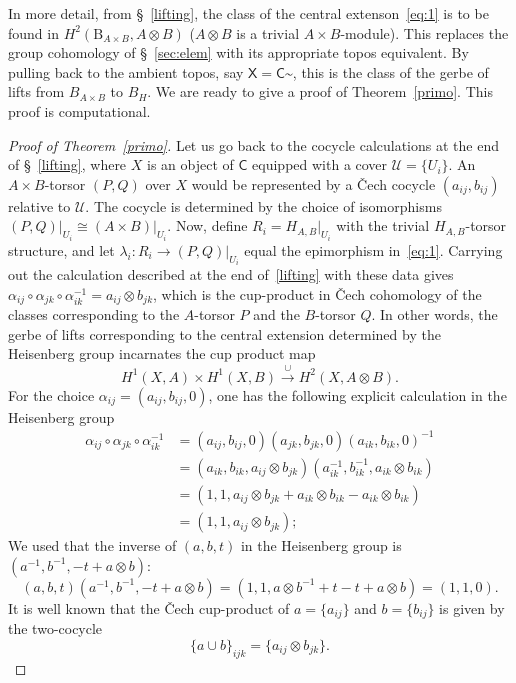 \documentclass{amsart}
\numberwithin{equation}{subsection}
\theoremstyle{remark}
\theoremstyle{remark}
\newcommand{\too}{\longrightarrow}%
\newcommand{\cU}{\mathcal{U}}
\newcommand{\B}{\mathrm{B}} %
\newcommand{\C}{\mathsf{C}} %
\newcommand{\iso}{\cong}
\newcommand{\shC}{\C\sptilde} %
\newcommand{\X}{\mathsf{X}} %
\begin{document}
In more detail, from \S~\ref{lifting}, the class of the central extenson~\eqref{eq:1} is to be found in
$H^2(\B_{A\times B},A\otimes B)$ ($A\otimes B$ is a trivial $A\times B$-module). This replaces the group cohomology of \S~\ref{sec:elem} with its appropriate topos equivalent. By pulling back to the ambient topos, say $\X=\shC$, this is the class of the gerbe of lifts from $B_{A\times B}$ to $B_H$. We are ready to give a proof of Theorem~\ref{primo}. This proof is computational.

\begin{proof}[Proof of Theorem~\ref{primo}]
  Let us go back to the cocycle calculations at the end of \S~\ref{lifting}, where $X$ is an object of $\C$ equipped with a cover $\cU=\lbrace U_i\rbrace$. An $A\times B$-torsor $(P,Q)$ over $X$ would be represented by a \v{C}ech cocycle $(a_{ij},b_{ij})$ relative to $\cU$. The cocycle is determined by the choice of isomorphisms $(P,Q)\rvert_{U_i}\iso (A\times B)\rvert_{U_i}$. Now, define $R_i = H_{A,B}\rvert_{U_i}$ with the trivial $H_{A,B}$-torsor structure, and let $\lambda_i\colon R_i\to (P,Q)\rvert_{U_i}$ equal the epimorphism in~\eqref{eq:1}. Carrying out the calculation described at the end of~\ref{lifting} with these data gives $\alpha_{ij}\circ \alpha_{jk}\circ \alpha_{ik}^{-1}=a_{ij}\otimes b_{jk}$, which is the cup-product in \v Cech cohomology of the classes corresponding to the $A$-torsor $P$ and the $B$-torsor $Q$. In other words, the gerbe of lifts corresponding to the central extension determined by the Heisenberg group incarnates the cup product map
  \begin{equation*}
    H^1(X,A) \times H^1(X,B) \overset{\cup}{\too} H^2(X,A\otimes B).
  \end{equation*}
  For the choice $\alpha_{ij} = (a_{ij}, b_{ij}, 0)$, one has the following explicit calculation in the Heisenberg group
  \begin{align*}
    \alpha_{ij}\circ \alpha_{jk}\circ \alpha_{ik}^{-1}
    & = (a_{ij}, b_{ij}, 0)(a_{jk}, b_{jk}, 0)(a_{ik}, b_{ik}, 0)^{-1}\\
    & = (a_{ik}, b_{ik}, a_{ij}\otimes b_{jk}) (a^{-1}_{ik}, b^{-1}_{ik}, a_{ik}\otimes b_{ik})\\
    & = (1,1, a_{ij} \otimes b_{jk} + a_{ik}\otimes b_{ik} - a_{ik} \otimes b_{ik}) \\
    & = (1,1, a_{ij} \otimes b_{jk});
  \end{align*}
  We used that the inverse of $(a, b, t)$ in the Heisenberg group is $(a^{-1}, b^{-1}, -t + a\otimes b)$:
  \begin{equation*}
    (a, b, t) (a^{-1}, b^{-1}, -t + a\otimes b)
    = (1, 1, a\otimes b^{-1} + t -t + a\otimes b) = (1,1,0).
  \end{equation*}
  It is well known \cite[Chapter 1, \S 1.3, Equation (1-18), p.~29]{Brylinskib} that
the \v Cech cup-product of $a =\{a_{ij}\}$ and $b = \{b_{ij}\}$ is given by the two-cocycle
\begin{equation*}
  \{a\cup b\}_{ijk} = \{a_{ij}\otimes b_{jk}\}.
\end{equation*}
 

\end{proof}
\end{document}
